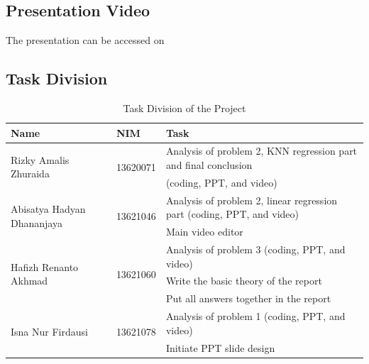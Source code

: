 \documentclass[conf]{new-aiaa}
\begin{document}
\subsection*{Presentation Video}
\noindent The presentation can be accessed on \url{}

\subsection*{Task Division}
\begin{table}[h]
    \centering
    \caption{Task Division of the Project}
    \begin{tabular}[width=1.0\textwidth]{lll}
        \toprule
        Name & NIM & Task \\
        \midrule
        \multirow{2}{*}{Rizky Amalis Zhuraida} & \multirow{2}{*}{13620071} & Analysis of problem 2, KNN regression part and final conclusion  \\
        & & (coding, PPT, and video) \\
        \midrule
        \multirow{2}{*}{Abisatya Hadyan Dhananjaya} & \multirow{2}{*}{13621046} & Analysis of problem 2, linear regression part (coding, PPT, and video) \\
        & & Main video editor \\
        \midrule
        \multirow{3}{*}{Hafizh Renanto Akhmad} & \multirow{3}{*}{13621060} & Analysis of problem 3 (coding, PPT, and video) \\
        & & Write the basic theory of the report \\
        & & Put all answers together in the report \\
        \midrule
        \multirow{2}{*}{Isna Nur Firdausi} & \multirow{2}{*}{13621078} & Analysis of problem 1 (coding, PPT, and video) \\
        & & Initiate PPT slide design \\
        \bottomrule
    \end{tabular}
\end{table}



    
\end{document}
